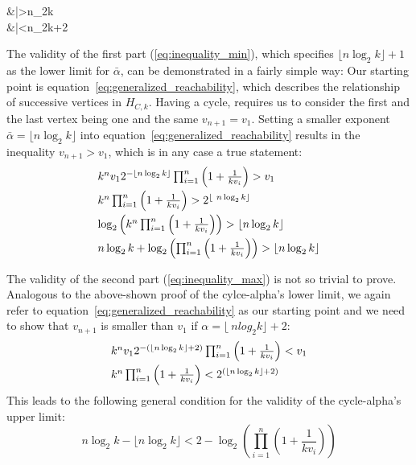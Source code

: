\begin{samepage}
	\begin{flalign}
	\label{eq:inequality_min}
	&\bar\alpha>\lfloor n\log_2k\rfloor\\	
	\label{eq:inequality_max}
	&\bar\alpha<\lfloor n\log_2k\rfloor+2
	\end{flalign}
\end{samepage}

The validity of the first part (\ref{eq:inequality_min}), which specifies $\lfloor n\log_2k\rfloor+1$ as the lower limit for $\bar\alpha$, can be demonstrated in a fairly simple way: Our starting point is equation~\ref{eq:generalized_reachability}, which describes the relationship of successive vertices in $H_{C,k}$. Having a cycle, requires us to consider the first and the last vertex being one and the same $v_{n+1}=v_1$. Setting a smaller exponent $\bar\alpha=\lfloor n\log_2k\rfloor$ into equation~\ref{eq:generalized_reachability} results in the inequality $v_{n+1}>v_1$, which is in any case a true statement:
\begin{equation*}
\begin{array}{l}
k^nv_12^{-\lfloor n\log_2k\rfloor}\prod_{i=1}^{n}\left(1+\frac{1}{kv_{i}}\right)>v_1
\\[\medskipamount]
k^n\prod_{i=1}^{n}\left(1+\frac{1}{kv_{i}}\right)>2^{\lfloor\ n\log_2k\rfloor}
\\[\medskipamount]
\log_2\left(k^n\prod_{i=1}^{n}\left(1+\frac{1}{kv_{i}}\right)\right)>\lfloor n\log_2k\rfloor
\\[\medskipamount]
n\log_2k+\log_2\left(\prod_{i=1}^{n}\left(1+\frac{1}{kv_{i}}\right)\right)>\lfloor n\log_2k\rfloor
\end{array}	
\end{equation*}

The validity of the second part (\ref{eq:inequality_max}) is not so trivial to prove. Analogous to the above-shown proof of the cylce-alpha's lower limit, we again refer to equation~\ref{eq:generalized_reachability} as our starting point and we need to show that $v_{n+1}$ is smaller than $v_1$ if $\alpha=\lfloor\ nlog_2k\rfloor+2$:
\begin{equation*}
\begin{array}{l}
k^nv_12^{-\left(\lfloor n\log_2k\rfloor+2\right)}\prod_{i=1}^{n}\left(1+\frac{1}{kv_{i}}\right)<v_1
\\[\medskipamount]
k^n\prod_{i=1}^{n}\left(1+\frac{1}{kv_{i}}\right)<2^{\left(\lfloor n\log_2k\rfloor+2\right)}
\end{array}	
\end{equation*}
This leads to the following general condition for the validity of the cycle-alpha's upper limit:
\begin{equation}
\label{eq:condition_max}
n\log_2k-\lfloor n\log_2k\rfloor<2-\log_2\left(\prod_{i=1}^{n}\left(1+\frac{1}{kv_{i}}\right)\right)
\end{equation}


